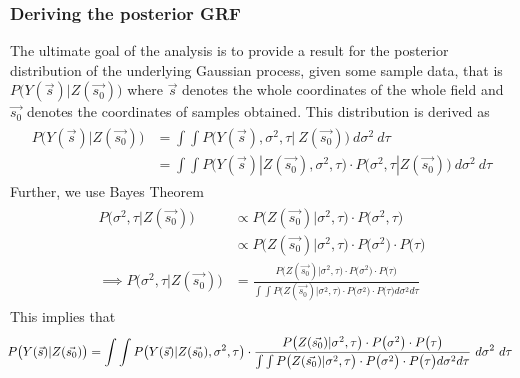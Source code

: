 \subsubsection{Deriving the posterior GRF}
The ultimate goal of the analysis is to provide a result for the posterior distribution of the underlying Gaussian process, given some sample data, that is $P \big( Y(\vec{s}) | Z(\vec{s_0}) \big)$ where $\vec{s}$ denotes the whole coordinates of the whole field and $\vec{s_0}$ denotes the coordinates of samples obtained. This distribution is derived as 
\begin{align*}
\begin{split}
P \big( Y(\vec{s}) | Z(\vec{s_0}) \big) &= \int \int P \big( Y(\vec{s}), \sigma^2, \tau | \ Z(\vec{s_0}) \big) \ d\sigma^2 \ d\tau \\
&= \int \int P \big( Y(\vec{s}) | Z(\vec{s_0}), \sigma^2, \tau \big) \cdot P\big( \sigma^2, \tau | Z(\vec{s_0}) \big) \ d\sigma^2 \ d\tau 
\end{split}
\end{align*}
Further, we use Bayes Theorem 
\begin{align}\label{eq:posterior_prior}
\begin{split}
P\big( \sigma^2, \tau | Z(\vec{s_0}) \big) &\propto P\big( Z(\vec{s_0}) | \sigma^2, \tau \big) \cdot P\big( \sigma^2, \tau \big) \\[5pt]
&\propto P\big( Z(\vec{s_0}) | \sigma^2, \tau \big) \cdot P\big( \sigma^2 \big) \cdot P\big( \tau \big) \\[10pt]
\implies P\big( \sigma^2, \tau | Z(\vec{s_0}) \big) &= \frac{P\big( Z(\vec{s_0}) | \sigma^2, \tau \big) \cdot P\big( \sigma^2 \big) \cdot P\big( \tau \big)}{\int \int P\big( Z(\vec{s_0}) | \sigma^2, \tau \big) \cdot P\big( \sigma^2 \big) \cdot P\big( \tau \big) d\sigma^2 d\tau}
\end{split}
\end{align}
This implies that 
\begin{equation}\label{eq:grf_posterior}
\hspace*{-0.1cm}
P \big( Y(\vec{s}) | Z(\vec{s_0}) \big) = \int \int P \big( Y(\vec{s}) | Z(\vec{s_0}), \sigma^2, \tau \big) \cdot \frac{P\big( Z(\vec{s_0}) | \sigma^2, \tau \big) \cdot P\big( \sigma^2 \big) \cdot P\big( \tau \big)}{\int \int P\big( Z(\vec{s_0}) | \sigma^2, \tau \big) \cdot P\big( \sigma^2 \big) \cdot P\big( \tau \big) d\sigma^2 d\tau} \ d\sigma^2 \ d\tau
\end{equation}

